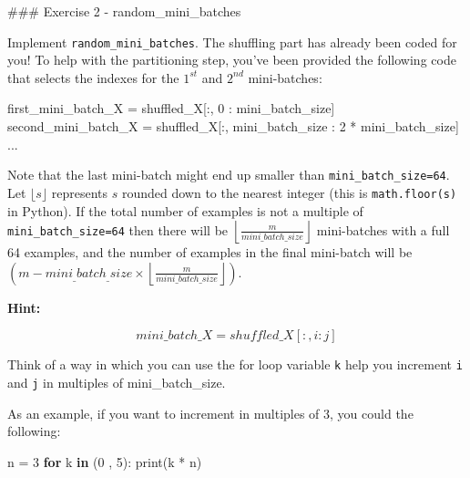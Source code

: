 \documentclass[11pt]{article}
\newenvironment{Shaded}{}{}
\newcommand{\KeywordTok}[1]{\textcolor[rgb]{0.00,0.44,0.13}{\textbf{{#1}}}}
\newcommand{\DecValTok}[1]{\textcolor[rgb]{0.25,0.63,0.44}{{#1}}}
\newcommand{\NormalTok}[1]{{#1}}
\newcommand{\ControlFlowTok}[1]{\textcolor[rgb]{0.00,0.44,0.13}{\textbf{{#1}}}}
\newcommand{\OperatorTok}[1]{\textcolor[rgb]{0.40,0.40,0.40}{{#1}}}
\newcommand{\BuiltInTok}[1]{{#1}}
\begin{document}
\#\#\# Exercise 2 - random\_mini\_batches

Implement \texttt{random\_mini\_batches}. The shuffling part has already
been coded for you! To help with the partitioning step, you've been
provided the following code that selects the indexes for the \(1^{st}\)
and \(2^{nd}\) mini-batches:

\begin{Shaded}
\begin{Highlighting}[]
\NormalTok{first\_mini\_batch\_X }\OperatorTok{=}\NormalTok{ shuffled\_X[:, }\DecValTok{0}\NormalTok{ : mini\_batch\_size]}
\NormalTok{second\_mini\_batch\_X }\OperatorTok{=}\NormalTok{ shuffled\_X[:, mini\_batch\_size : }\DecValTok{2} \OperatorTok{*}\NormalTok{ mini\_batch\_size]}
\NormalTok{...}
\end{Highlighting}
\end{Shaded}

Note that the last mini-batch might end up smaller than
\texttt{mini\_batch\_size=64}. Let \(\lfloor s \rfloor\) represents
\(s\) rounded down to the nearest integer (this is
\texttt{math.floor(s)} in Python). If the total number of examples is
not a multiple of \texttt{mini\_batch\_size=64} then there will be
\(\left\lfloor \frac{m}{mini\_batch\_size}\right\rfloor\) mini-batches
with a full 64 examples, and the number of examples in the final
mini-batch will be
\(\left(m-mini_\_batch_\_size \times \left\lfloor \frac{m}{mini\_batch\_size}\right\rfloor\right)\).

\textbf{Hint:}

\[mini\_batch\_X = shuffled\_X[:, i : j]\]

Think of a way in which you can use the for loop variable \texttt{k}
help you increment \texttt{i} and \texttt{j} in multiples of
mini\_batch\_size.

As an example, if you want to increment in multiples of 3, you could the
following:

\begin{Shaded}
\begin{Highlighting}[]
\NormalTok{n }\OperatorTok{=} \DecValTok{3}
\ControlFlowTok{for}\NormalTok{ k }\KeywordTok{in}\NormalTok{ (}\DecValTok{0}\NormalTok{ , }\DecValTok{5}\NormalTok{):}
    \BuiltInTok{print}\NormalTok{(k }\OperatorTok{*}\NormalTok{ n)}
\end{Highlighting}
\end{Shaded}
\end{document}
